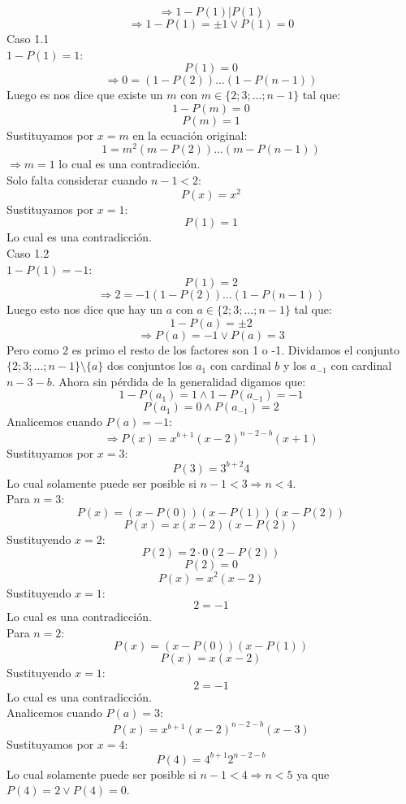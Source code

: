 \documentclass{book}
\begin{document}
\begin{enumerate}
              $$\Rightarrow 1-P(1)|P(1)$$
              $$\Rightarrow 1-P(1)=\pm 1\vee P(1)=0$$
              Caso 1.1 \\$1-P(1)=1$:
          $$P(1)=0$$
          $$\Rightarrow 0=(1-P(2))\ldots(1-P(n-1))$$
          Luego es nos dice que existe un $m$ con $m\in\{2;3;\ldots;n-1\}$ tal que:
          $$1-P(m)=0$$
          $$P(m)=1$$
          Sustituyamos por $x=m$ en la ecuación original:
          $$1=m^2(m-P(2))\ldots(m-P(n-1))$$
          $\Rightarrow m=1$ lo cual es una contradicción.\\
          Solo falta considerar cuando $n-1<2$:
          $$P(x)=x^2$$
          Sustituyamos por $x=1$:
          $$P(1)=1$$
          Lo cual es una contradicción.\\
          Caso 1.2 \\$1-P(1)=-1$:
              $$P(1)=2$$
              $$\Rightarrow 2=-1(1-P(2))\ldots(1-P(n-1))$$
              Luego esto nos dice que hay un $a$ con $a\in\{2;3;\ldots;n-1\}$ tal que:
              $$1-P(a)=\pm 2$$
              $$\Rightarrow P(a)=-1\vee P(a)=3$$
              Pero como 2 es primo el resto de los factores son 1 o -1. Dividamos el conjunto $\{2;3;\ldots;n-1\}\setminus \{a\}$ dos conjuntos los $a_1$ con cardinal $b$ y los $a_{-1}$ con cardinal $n-3-b$. Ahora sin pérdida de la generalidad digamos que:
              $$1-P(a_1)=1\wedge 1-P(a_{-1})=-1$$
              $$P(a_1)=0\wedge P(a_{-1})=2$$
              Analicemos cuando $P(a)=-1$:
              $$\Rightarrow P(x)=x^{b+1}{(x-2)}^{n-2-b}(x+1)$$
              Sustituyamos por $x=3$:
              $$P(3)=3^{b+2}4$$
              Lo cual solamente puede ser posible si $n-1<3\Rightarrow n<4$.\\
              Para $n=3$:
              $$P(x)=(x-P(0))(x-P(1))(x-P(2))$$
              $$P(x)=x(x-2)(x-P(2))$$
              Sustituyendo $x=2$:
              $$P(2)=2\cdot 0(2-P(2))$$
              $$P(2)=0$$
              $$P(x)=x^2(x-2)$$
              Sustituyendo $x=1$:
              $$2=-1$$
              Lo cual es una contradicción.\\
              Para $n=2$:
              $$P(x)=(x-P(0))(x-P(1))$$
              $$P(x)=x(x-2)$$
              Sustituyendo $x=1$:
              $$2=-1$$
              Lo cual es una contradicción.\\
              Analicemos cuando $P(a)=3$:
              $$P(x)=x^{b+1}{(x-2)}^{n-2-b}(x-3)$$
              Sustituyamos por $x=4$:
              $$P(4)=4^{b+1}{2}^{n-2-b}$$
              Lo cual solamente puede ser posible si $n-1<4\Rightarrow n<5$ ya que $P(4)=2\vee P(4)=0$.\\

\end{enumerate}
\end{document}
